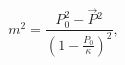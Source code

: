 \begin{equation}\label{2}
 m^2 = \frac{P_{0}^2 - \vec{P}{}^2}{\left(1- \frac{P_0}\kappa\right)^2},
\end{equation}

